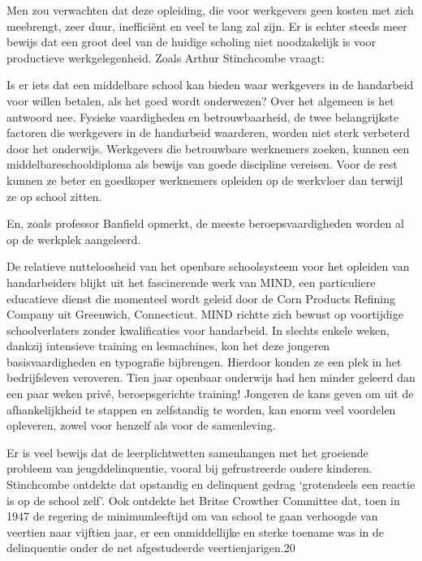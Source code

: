 \documentclass[
  a5paper,
  smalldemyvopaper,10pt,twoside,onecolumn,openright,extrafontsizes,hidelinks]{memoir}
\renewenvironment{quote}%
               {\list{}{\rightmargin=.6cm\leftmargin=.6cm}%
                \itshape \item[]}%
               {\endlist}
\begin{document}
Men zou verwachten dat deze opleiding, die voor werkgevers geen kosten
met zich meebrengt, zeer duur, inefficiënt en veel te lang zal zijn. Er
is echter steeds meer bewijs dat een groot deel van de huidige scholing
niet noodzakelijk is voor productieve werkgelegenheid. Zoals Arthur
Stinchcombe vraagt:

\begin{quote}
Is er iets dat een middelbare school kan bieden waar werkgevers in de
handarbeid voor willen betalen, als het goed wordt onderwezen? Over het
algemeen is het antwoord nee. Fysieke vaardigheden en betrouwbaarheid,
de twee belangrijkste factoren die werkgevers in de handarbeid
waarderen, worden niet sterk verbeterd door het onderwijs. Werkgevers
die betrouwbare werknemers zoeken, kunnen een middelbareschooldiploma
als bewijs van goede discipline vereisen. Voor de rest kunnen ze beter
en goedkoper werknemers opleiden op de werkvloer dan terwijl ze op
school zitten.
\end{quote}

En, zoals professor Banfield opmerkt, de meeste beroepsvaardigheden
worden al op de werkplek aangeleerd.

De relatieve nutteloosheid van het openbare schoolsysteem voor het
opleiden van handarbeiders blijkt uit het fascinerende werk van MIND,
een particuliere educatieve dienst die momenteel wordt geleid door de
Corn Products Refining Company uit Greenwich, Connecticut. MIND richtte
zich bewust op voortijdige schoolverlaters zonder kwalificaties voor
handarbeid. In slechts enkele weken, dankzij intensieve training en
lesmachines, kon het deze jongeren basisvaardigheden en typografie
bijbrengen. Hierdoor konden ze een plek in het bedrijfsleven veroveren.
Tien jaar openbaar onderwijs had hen minder geleerd dan een paar weken
privé, beroepsgerichte training! Jongeren de kans geven om uit de
afhankelijkheid te stappen en zelfstandig te worden, kan enorm veel
voordelen opleveren, zowel voor henzelf als voor de samenleving.

Er is veel bewijs dat de leerplichtwetten samenhangen met het groeiende
probleem van jeugddelinquentie, vooral bij gefrustreerde oudere
kinderen. Stinchcombe ontdekte dat opstandig en delinquent gedrag
`grotendeels een reactie is op de school zelf'. Ook ontdekte het Britse
Crowther Committee dat, toen in 1947 de regering de minimumleeftijd om
van school te gaan verhoogde van veertien naar vijftien jaar, er een
onmiddellijke en sterke toename was in de delinquentie onder de net
afgestudeerde veertienjarigen.20
\end{document}
